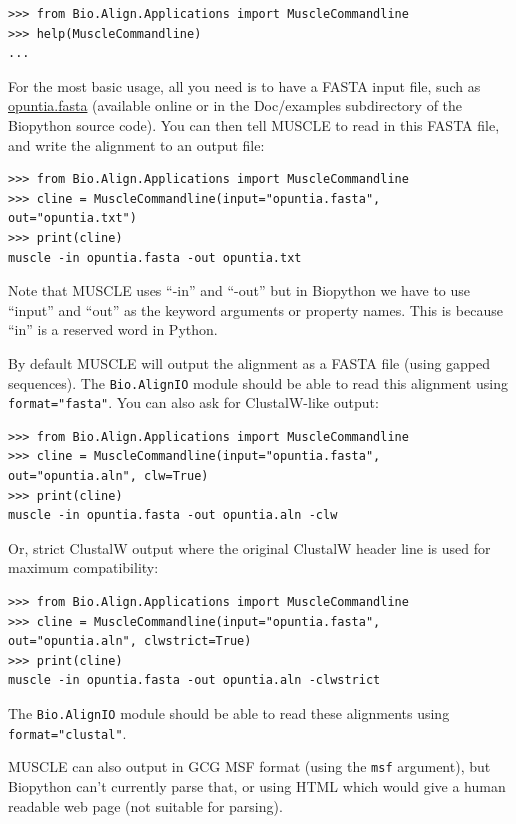 \documentclass{report}
\begin{document}
\begin{verbatim}
>>> from Bio.Align.Applications import MuscleCommandline
>>> help(MuscleCommandline)
...
\end{verbatim}

For the most basic usage, all you need is to have a FASTA input file, such as
\href{http://biopython.org/DIST/docs/tutorial/examples/opuntia.fasta}{opuntia.fasta}
(available online or in the Doc/examples subdirectory of the Biopython source
code). You can then tell MUSCLE to read in this FASTA file, and write the
alignment to an output file:

\begin{verbatim}
>>> from Bio.Align.Applications import MuscleCommandline
>>> cline = MuscleCommandline(input="opuntia.fasta", out="opuntia.txt")
>>> print(cline)
muscle -in opuntia.fasta -out opuntia.txt
\end{verbatim}

Note that MUSCLE uses ``-in'' and ``-out'' but in Biopython we have to use
``input'' and ``out'' as the keyword arguments or property names. This is
because ``in'' is a reserved word in Python.

By default MUSCLE will output the alignment as a FASTA file (using gapped
sequences). The \verb|Bio.AlignIO| module should be able to read this
alignment using \texttt{format="fasta"}.
You can also ask for ClustalW-like output:

\begin{verbatim}
>>> from Bio.Align.Applications import MuscleCommandline
>>> cline = MuscleCommandline(input="opuntia.fasta", out="opuntia.aln", clw=True)
>>> print(cline)
muscle -in opuntia.fasta -out opuntia.aln -clw
\end{verbatim}

Or, strict ClustalW output where the original ClustalW header line is
used for maximum compatibility:

\begin{verbatim}
>>> from Bio.Align.Applications import MuscleCommandline
>>> cline = MuscleCommandline(input="opuntia.fasta", out="opuntia.aln", clwstrict=True)
>>> print(cline)
muscle -in opuntia.fasta -out opuntia.aln -clwstrict
\end{verbatim}

\noindent The \verb|Bio.AlignIO| module should be able to read these alignments
using \texttt{format="clustal"}.

MUSCLE can also output in GCG MSF format (using the \texttt{msf} argument), but
Biopython can't currently parse that, or using HTML which would give a human
readable web page (not suitable for parsing).
\end{document}
